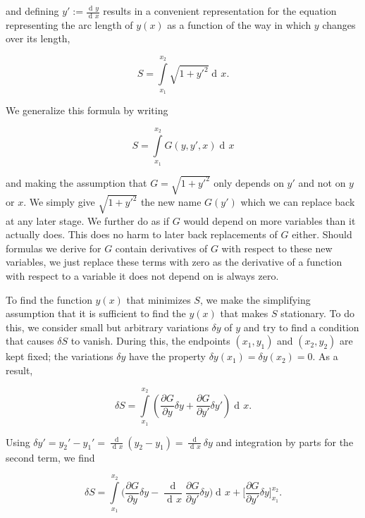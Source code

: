 \documentclass{article}
\DeclareMathOperator{\dd}{d\!}
\DeclareMathOperator{\ddd}{\mathrm{d}}
\begin{document}
and defining $y' := \frac{\dd y}{\dd x}$ results in a convenient representation for the equation representing the arc length of $y(x)$ as a function of the way in which $y$ changes over its length, %

\begin{equation}
S = \int\limits_{x_1}^{x_2}\sqrt{1 + y'^2} \dd x.
\end{equation}

We generalize this formula by writing

\begin{equation}
S=\int\limits_{x_1}^{x_2} G(y,y',x) \dd x
\end{equation}



and making the assumption that $G = \sqrt{1 + y'^2}$ only depends on $y'$ and not on $y$ or $x$. We simply give $\sqrt{1+y'^2}$ the new name $G(y')$ which we can replace back at any later stage. We further do as if $G$ would depend on more variables than it actually does. This does no harm to later back replacements of $G$ either. Should formulas we derive for $G$ contain derivatives of $G$ with respect to these new variables, we just replace these terms with zero as the derivative of a function with respect to a variable it does not depend on is always zero. %

To find the function $y(x)$ that minimizes $S$, we make the simplifying assumption that it is sufficient to find the $y(x)$ that makes $S$ stationary. To do this, we consider small but arbitrary variations $\delta y$ of $y$ and try to find a condition that causes $\delta S$ to vanish. During this, the endpoints $(x_1,y_1)$ and $(x_2,y_2)$ are kept fixed; the variations $\delta y$ have the property $\delta y(x_1) = \delta y(x_2) = 0$. As a result,

\begin{equation}
\delta S = \int\limits_{x_1}^{x_2} \left(\frac{\partial G}{\partial y} \delta y
+ \frac{\partial G}{\partial y'} \delta y' \right) \dd x.
\end{equation}

Using $\delta y' = y_2' - y_1' = \frac{\ddd }{\dd x}(y_2 - y_1) = \frac{\ddd}{\dd x} \delta y$ and integration by parts for the second term, we find

\begin{equation}
\delta S = \int\limits_{x_1}^{x_2} \bigg( \frac{\partial G}{\partial y} \delta y
- \frac{\ddd}{\dd x}\frac{\partial G}{\partial y'} \delta y \bigg) \dd x
+ \bigg[\frac{\partial G}{\partial y'} \delta y \bigg]_{x_1}^{x_2}.
\end{equation}
\end{document}
